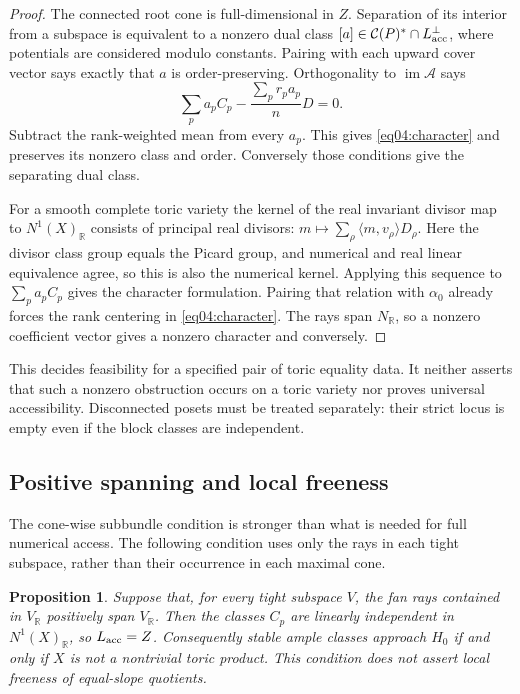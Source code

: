 \documentclass[11pt]{amsart}
\newtheorem{proposition}[theorem]{Proposition}
\theoremstyle{definition}
\theoremstyle{remark}
\newcommand{\RR}{\mathbb R}
\newcommand{\cC}{\mathcal C}
\newcommand{\im}{\operatorname{im}}
\begin{document}
\begin{proof}
The connected root cone is full-dimensional in \(Z\). Separation of
its interior from a subspace is equivalent to a nonzero dual class
\([a]\in\cC(P)^*\cap L_{\rm acc}^{\perp}\), where potentials
are considered modulo constants. Pairing with each upward cover
vector says exactly that \(a\) is order-preserving.
Orthogonality to \(\im\mathcal A\) says
\[
 \sum_pa_pC_p-\frac{\sum_pr_pa_p}{n}D=0.
\]
Subtract the rank-weighted mean from every \(a_p\). This gives
\eqref{eq04:character} and preserves its nonzero class and order.
Conversely those conditions give the separating dual class.

For a smooth complete toric variety the kernel of the real invariant
divisor map to \(N^1(X)_\RR\) consists of principal real divisors:
\(m\mapsto\sum_\rho\langle m,v_\rho\rangle D_\rho\).
Here the divisor class group equals the Picard group, and numerical
and real linear equivalence agree, so this is also the numerical
kernel. Applying this sequence to \(\sum_pa_pC_p\) gives the
character formulation. Pairing that relation with \(\alpha_0\)
already forces the rank centering in \eqref{eq04:character}.
The rays span \(N_\RR\), so a nonzero coefficient vector gives
a nonzero character and conversely.
\end{proof}

This decides feasibility for a specified pair of toric equality data.
It neither asserts that such a nonzero obstruction occurs on a toric
variety nor proves universal accessibility. Disconnected posets must
be treated separately: their strict locus is empty even if the block
classes are independent.

\subsection*{Positive spanning and local freeness}

The cone-wise subbundle condition is stronger than what is needed for
full numerical access. The following condition uses only the rays in
each tight subspace, rather than their occurrence in each maximal cone.

\begin{proposition}\label{prop04:positive}
Suppose that, for every tight subspace $V$, the fan rays contained in
$V_\RR$ positively span $V_\RR$. Then the classes $C_p$ are linearly
independent in $N^1(X)_\RR$, so $L_{\rm acc}=Z$. Consequently stable
ample classes approach $H_0$ if and only if $X$ is not a nontrivial
toric product. This condition does not assert local freeness of
equal-slope quotients.
\end{proposition}
\end{document}
